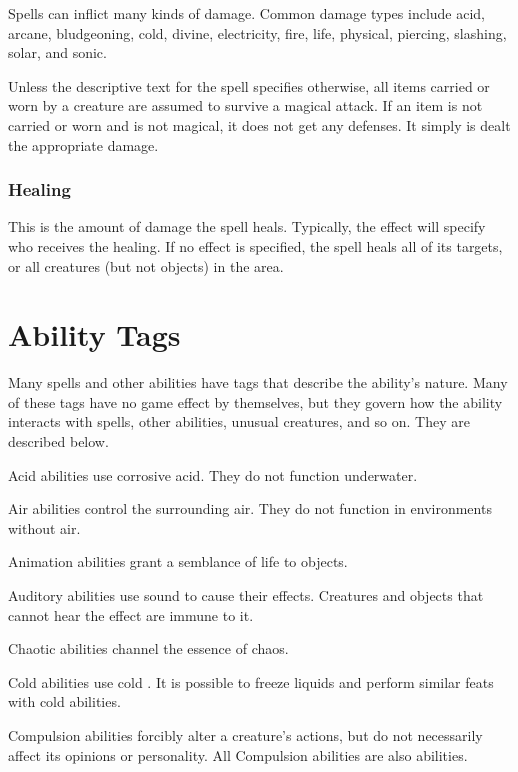             Spells can inflict many kinds of damage.
            Common damage types include acid, arcane, bludgeoning, cold, divine, electricity, fire, life, physical, piercing, slashing, solar, and sonic.

             Unless the descriptive text for the spell specifies otherwise, all items carried or worn by a creature are assumed to survive a magical attack.
            If an item is not carried or worn and is not magical, it does not get any defenses.
            It simply is dealt the appropriate damage.

        \subsubsection{Healing}
            This is the amount of damage the spell heals.
            Typically, the effect will specify who receives the healing.
            If no effect is specified, the spell heals all of its targets, or all creatures (but not objects) in the area.

\section{Ability Tags}\label{Ability Tags}

    Many spells and other abilities have tags that describe the ability's nature.
    Many of these tags have no game effect by themselves, but they govern how the ability interacts with spells, other abilities, unusual creatures, and so on.
    They are described below.

     Acid abilities use corrosive acid.
    They do not function underwater.

     Air abilities control the surrounding air.
    They do not function in environments without air.

     Animation abilities grant a semblance of life to objects.

     Auditory abilities use sound to cause their effects.
    Creatures and objects that cannot hear the effect are immune to it.

     Chaotic abilities channel the essence of chaos.

     Cold abilities use cold . It is possible to freeze liquids and perform similar feats with cold abilities.

     Compulsion abilities forcibly alter a creature's actions, but do not necessarily affect its opinions or personality.
    All Compulsion abilities are also  abilities.


